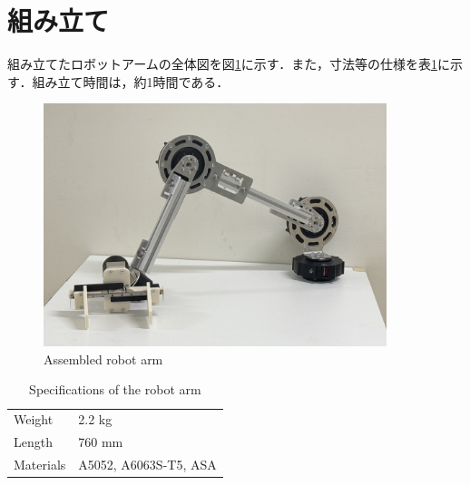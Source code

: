 \section{組み立て}
組み立てたロボットアームの全体図を図\ref{fig:arm}に示す．また，寸法等の仕様を表\ref{tab:arm}に示す．組み立て時間は，約1時間である．
\begin{figure}[h]
  \centering
  \includegraphics[width=10cm]{images/product/arm.jpg}
  \caption{Assembled robot arm}
  \label{fig:arm}
\end{figure}
\begin{table}[h]
  \centering
  \caption{Specifications of the robot arm}
  \begin{tabular}{ll}
  \hline
  Weight    & 2.2 kg                \\
  Length    & 760 mm                \\
  Materials & A5052, A6063S-T5, ASA \\ \hline
  \end{tabular}
  \label{tab:arm}
\end{table}

\newpage